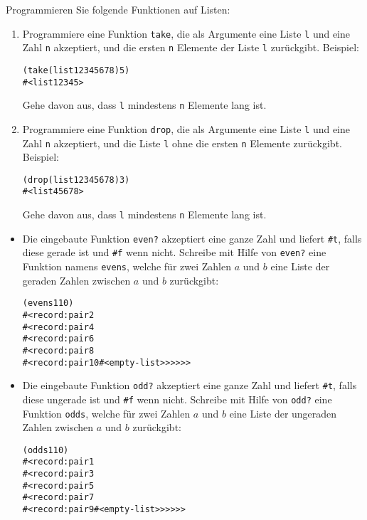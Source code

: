 \begin{aufgabe}\label{ex:drop}
  Programmieren Sie folgende Funktionen auf Listen:
  \begin{enumerate}
  \item Programmiere eine Funktion \texttt{take}, die als
    Argumente eine Liste \texttt{l} und eine Zahl \texttt{n}
    akzeptiert, und die ersten \texttt{n} Elemente der Liste
    \texttt{l} zurückgibt. Beispiel:
    \begin{alltt}
      (take (list 1 2 3 4 5 6 7 8) 5)
      \evalsto{} #<list 1 2 3 4 5>
    \end{alltt}
    Gehe davon aus, dass \texttt{l} mindestens \texttt{n}
    Elemente lang ist.

  \item Programmiere eine Funktion \texttt{drop}, die als
    Argumente eine Liste \texttt{l} und eine Zahl \texttt{n}
    akzeptiert, und die Liste \texttt{l} ohne die ersten \texttt{n}
    Elemente zurückgibt.  Beispiel:
    \begin{alltt}
      (drop (list 1 2 3 4 5 6 7 8) 3)
      \evalsto{} #<list 4 5 6 7 8>
    \end{alltt}
    Gehe davon aus, dass \texttt{l} mindestens \texttt{n}
    Elemente lang ist.
    \end{enumerate}
\end{aufgabe}


\begin{aufgabe}\label{ex:evensodds}
  \begin{itemize}
  \item
    Die eingebaute Funktion \texttt{even?}
    akzeptiert eine ganze Zahl und liefert \verb|#t|, falls diese
    gerade ist und \verb|#f| wenn nicht.
    Schreibe mit Hilfe von \texttt{even?}
    eine Funktion namens \texttt{evens}, welche für zwei
    Zahlen $a$ und $b$ eine Liste der geraden Zahlen zwischen $a$ und
    $b$ zurückgibt:
\begin{alltt}
(evens 1 10)
\evalsto{} #<record:pair 2
     #<record:pair 4
       #<record:pair 6
         #<record:pair 8
           #<record:pair 10 #<empty-list>>>>>>
\end{alltt}
  \item
    Die eingebaute Funktion \texttt{odd?}
    akzeptiert eine ganze Zahl und liefert \verb|#t|, falls diese
    ungerade ist und \verb|#f| wenn nicht.
    Schreibe mit Hilfe von \texttt{odd?} eine Funktion \texttt{odds}, welche für zwei
    Zahlen $a$ und $b$ eine Liste der ungeraden Zahlen zwischen $a$ und $b$
    zurückgibt:
\begin{alltt}
(odds 1 10)
\evalsto{} #<record:pair 1
     #<record:pair 3
       #<record:pair 5
         #<record:pair 7
           #<record:pair 9 #<empty-list>>>>>>
\end{alltt}
  \end{itemize}
\end{aufgabe}

